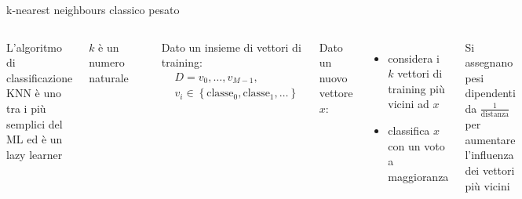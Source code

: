 \documentclass{beamer}
\begin{document}
    \begin{frame}{k-nearest neighbours classico pesato}
        \begin{columns}
            L'algoritmo di classificazione KNN è uno tra i più semplici del ML ed è un lazy learner

            \vspace{.5cm}

            $k$ è un numero naturale 

            \begin{center}
                \includegraphics[width=.6\columnwidth]{gfx/KnnClassification.png}
            \end{center}


            Dato un insieme di vettori di training: 
            \begin{equation*}
                \begin{split}
                    &D = v_0,\ldots,v_{M-1}, \\
                    &v_i\in\left\{ \text{classe}_0, \text{classe}_1, \ldots \right\}
                \end{split}
            \end{equation*}

            Dato un nuovo vettore $x$: 
            \begin{itemize}
                \item considera i $k$ vettori di training più vicini ad $x$
                \item classifica $x$ con un voto a maggioranza
            \end{itemize}

            Si assegnano pesi dipendenti da $\frac{1}{\text{distanza}}$ per aumentare l'influenza 
            dei vettori più vicini
        \end{columns}
    \end{frame}
\end{document}
